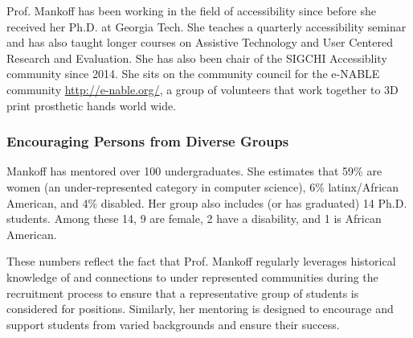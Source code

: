 Prof. Mankoff has been working in the field of accessibility since before she received her Ph.D.  at Georgia Tech. She teaches a quarterly accessibility seminar and has also taught longer courses on Assistive Technology and User Centered Research and Evaluation. She has also been chair of the SIGCHI Accessiblity community since 2014. She sits on the community council for the e-NABLE community \url{http://e-nable.org/}, a group of volunteers that work together to 3D print prosthetic hands world wide.

\subsubsection{Encouraging Persons from Diverse Groups}
Mankoff has mentored over 100
undergraduates. She estimates that 59\% are women (an under-represented category in computer science), 6\% latinx/African American, and 4\% disabled. Her group also includes (or has graduated) 14 Ph.D. students. Among these 14, 9 are female, 2 have a disability, and 1 is African American. 

These numbers reflect the fact that Prof. Mankoff regularly  leverages  historical knowledge of and connections to under
represented communities during the recruitment process to ensure that a representative group of students is considered for  positions. Similarly, her mentoring is designed to encourage and support students from varied backgrounds and ensure their success. 
